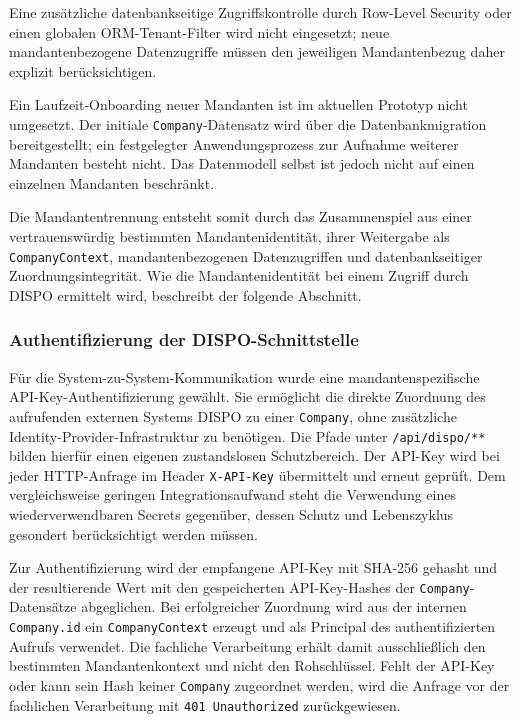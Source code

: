 Eine zusätzliche datenbankseitige Zugriffskontrolle durch Row-Level Security
oder einen globalen ORM-Tenant-Filter wird nicht eingesetzt; neue
mandantenbezogene Datenzugriffe müssen den jeweiligen Mandantenbezug daher
explizit berücksichtigen.

Ein Laufzeit-Onboarding neuer Mandanten ist im aktuellen Prototyp nicht
umgesetzt. Der initiale \texttt{Company}-Datensatz wird über die
Datenbankmigration bereitgestellt; ein festgelegter Anwendungsprozess zur
Aufnahme weiterer Mandanten besteht nicht. Das Datenmodell selbst ist jedoch
nicht auf einen einzelnen Mandanten beschränkt.

Die Mandantentrennung entsteht somit durch das Zusammenspiel aus einer
vertrauenswürdig bestimmten Mandantenidentität, ihrer Weitergabe als
\texttt{CompanyContext}, mandantenbezogenen Datenzugriffen und
datenbankseitiger Zuordnungsintegrität. Wie die Mandantenidentität bei einem
Zugriff durch DISPO ermittelt wird, beschreibt der folgende Abschnitt.

\subsubsection{Authentifizierung der DISPO-Schnittstelle}
\label{sec:dispo-authentifizierung}

Für die System-zu-System-Kommunikation wurde eine mandantenspezifische
API-Key-Authentifizierung gewählt. Sie ermöglicht die direkte Zuordnung des
aufrufenden externen Systems DISPO zu einer \texttt{Company}, ohne zusätzliche
Identity-Provider-Infrastruktur zu benötigen. Die Pfade unter
\texttt{/api/dispo/**} bilden hierfür einen eigenen zustandslosen Schutzbereich.
Der API-Key wird bei jeder HTTP-Anfrage im Header
\texttt{X-API-Key} übermittelt und erneut geprüft. Dem vergleichsweise geringen
Integrationsaufwand steht die Verwendung eines wiederverwendbaren Secrets
gegenüber, dessen Schutz und Lebenszyklus gesondert berücksichtigt werden
müssen.

Zur Authentifizierung wird der empfangene API-Key mit SHA-256 gehasht und der
resultierende Wert mit den gespeicherten API-Key-Hashes der
\texttt{Company}-Datensätze abgeglichen. Bei erfolgreicher Zuordnung wird aus
der internen \texttt{Company.id} ein \texttt{CompanyContext} erzeugt und als
Principal des authentifizierten Aufrufs verwendet. Die fachliche Verarbeitung
erhält damit ausschließlich den bestimmten Mandantenkontext und nicht den
Rohschlüssel. Fehlt der API-Key oder kann sein Hash keiner \texttt{Company}
zugeordnet werden, wird die Anfrage vor der fachlichen Verarbeitung mit
\texttt{401 Unauthorized} zurückgewiesen.

